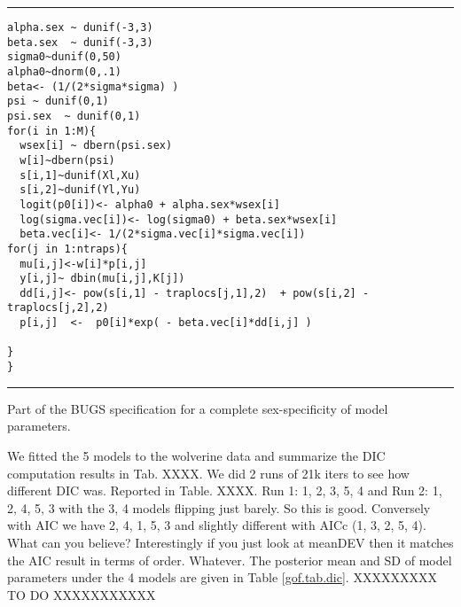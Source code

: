 \begin{panel}[htp]
\centering
\rule[0.15in]{\textwidth}{.03in}
{\small
\begin{verbatim}
alpha.sex ~ dunif(-3,3)
beta.sex  ~ dunif(-3,3)
sigma0~dunif(0,50)
alpha0~dnorm(0,.1)
beta<- (1/(2*sigma*sigma) )
psi ~ dunif(0,1)
psi.sex  ~ dunif(0,1)
for(i in 1:M){
  wsex[i] ~ dbern(psi.sex)
  w[i]~dbern(psi)
  s[i,1]~dunif(Xl,Xu)
  s[i,2]~dunif(Yl,Yu)
  logit(p0[i])<- alpha0 + alpha.sex*wsex[i]
  log(sigma.vec[i])<- log(sigma0) + beta.sex*wsex[i]
  beta.vec[i]<- 1/(2*sigma.vec[i]*sigma.vec[i])
for(j in 1:ntraps){
  mu[i,j]<-w[i]*p[i,j]
  y[i,j]~ dbin(mu[i,j],K[j])
  dd[i,j]<- pow(s[i,1] - traplocs[j,1],2)  + pow(s[i,2] - traplocs[j,2],2)
  p[i,j]  <-  p0[i]*exp( - beta.vec[i]*dd[i,j] )

}
}
\end{verbatim}
}
\rule[-0.15in]{\textwidth}{.03in}
\caption{
Part of the BUGS specification for a complete sex-specificity of model
parameters.   
}
\label{gof.panel.sexmodel}
\end{panel}


We fitted the 5 models to the wolverine data and summarize
the DIC computation results in Tab. XXXX.  We did 2 runs of 21k iters
to see how different DIC was. Reported in Table. XXXX.
Run 1: 1, 2, 3, 5, 4 and Run 2: 1, 2, 4, 5, 3 with the 3, 4 models
flipping just barely.  So this is good.
Conversely with AIC we have  2, 4, 1, 5, 3 and slightly different with
AICc (1, 3, 2, 5, 4). What can you believe?
Interestingly if you just look at meanDEV then it matches the AIC
result in terms of order. Whatever.
The posterior mean and SD of model parameters under the 4 models are
given in Table \ref{gof.tab.dic}. XXXXXXXXX TO DO XXXXXXXXXXX




